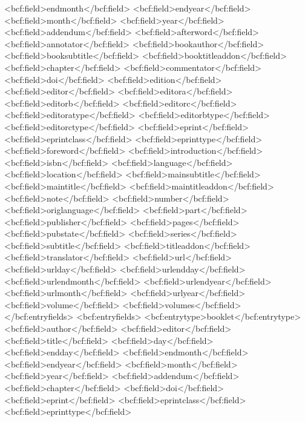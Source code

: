       <bcf:field>endmonth</bcf:field>
      <bcf:field>endyear</bcf:field>
      <bcf:field>month</bcf:field>
      <bcf:field>year</bcf:field>
      <bcf:field>addendum</bcf:field>
      <bcf:field>afterword</bcf:field>
      <bcf:field>annotator</bcf:field>
      <bcf:field>bookauthor</bcf:field>
      <bcf:field>booksubtitle</bcf:field>
      <bcf:field>booktitleaddon</bcf:field>
      <bcf:field>chapter</bcf:field>
      <bcf:field>commentator</bcf:field>
      <bcf:field>doi</bcf:field>
      <bcf:field>edition</bcf:field>
      <bcf:field>editor</bcf:field>
      <bcf:field>editora</bcf:field>
      <bcf:field>editorb</bcf:field>
      <bcf:field>editorc</bcf:field>
      <bcf:field>editoratype</bcf:field>
      <bcf:field>editorbtype</bcf:field>
      <bcf:field>editorctype</bcf:field>
      <bcf:field>eprint</bcf:field>
      <bcf:field>eprintclass</bcf:field>
      <bcf:field>eprinttype</bcf:field>
      <bcf:field>foreword</bcf:field>
      <bcf:field>introduction</bcf:field>
      <bcf:field>isbn</bcf:field>
      <bcf:field>language</bcf:field>
      <bcf:field>location</bcf:field>
      <bcf:field>mainsubtitle</bcf:field>
      <bcf:field>maintitle</bcf:field>
      <bcf:field>maintitleaddon</bcf:field>
      <bcf:field>note</bcf:field>
      <bcf:field>number</bcf:field>
      <bcf:field>origlanguage</bcf:field>
      <bcf:field>part</bcf:field>
      <bcf:field>publisher</bcf:field>
      <bcf:field>pages</bcf:field>
      <bcf:field>pubstate</bcf:field>
      <bcf:field>series</bcf:field>
      <bcf:field>subtitle</bcf:field>
      <bcf:field>titleaddon</bcf:field>
      <bcf:field>translator</bcf:field>
      <bcf:field>url</bcf:field>
      <bcf:field>urlday</bcf:field>
      <bcf:field>urlendday</bcf:field>
      <bcf:field>urlendmonth</bcf:field>
      <bcf:field>urlendyear</bcf:field>
      <bcf:field>urlmonth</bcf:field>
      <bcf:field>urlyear</bcf:field>
      <bcf:field>volume</bcf:field>
      <bcf:field>volumes</bcf:field>
    </bcf:entryfields>
    <bcf:entryfields>
      <bcf:entrytype>booklet</bcf:entrytype>
      <bcf:field>author</bcf:field>
      <bcf:field>editor</bcf:field>
      <bcf:field>title</bcf:field>
      <bcf:field>day</bcf:field>
      <bcf:field>endday</bcf:field>
      <bcf:field>endmonth</bcf:field>
      <bcf:field>endyear</bcf:field>
      <bcf:field>month</bcf:field>
      <bcf:field>year</bcf:field>
      <bcf:field>addendum</bcf:field>
      <bcf:field>chapter</bcf:field>
      <bcf:field>doi</bcf:field>
      <bcf:field>eprint</bcf:field>
      <bcf:field>eprintclass</bcf:field>
      <bcf:field>eprinttype</bcf:field>
